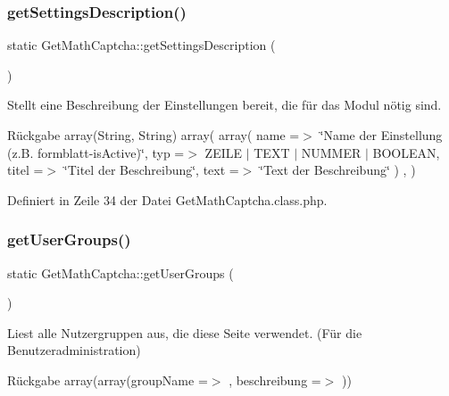 \subsubsection{\texorpdfstring{get\+Settings\+Description()}{getSettingsDescription()}\hspace{0.1cm}{\footnotesize\ttfamily [2/2]}}
{\footnotesize\ttfamily static Get\+Math\+Captcha\+::get\+Settings\+Description (\begin{DoxyParamCaption}{ }\end{DoxyParamCaption})\hspace{0.3cm}{\ttfamily [static]}}

Stellt eine Beschreibung der Einstellungen bereit, die für das Modul nötig sind. \begin{DoxyReturn}{Rückgabe}
array(\+String, String) array( array( \textquotesingle{}name\textquotesingle{} =$>$ \char`\"{}\+Name der Einstellung (z.\+B. formblatt-\/is\+Active)\char`\"{}, \textquotesingle{}typ\textquotesingle{} =$>$ Z\+E\+I\+LE $\vert$ T\+E\+XT $\vert$ N\+U\+M\+M\+ER $\vert$ B\+O\+O\+L\+E\+AN, \textquotesingle{}titel\textquotesingle{} =$>$ \char`\"{}\+Titel der Beschreibung\char`\"{}, \textquotesingle{}text\textquotesingle{} =$>$ \char`\"{}\+Text der Beschreibung\char`\"{} ) , ) 
\end{DoxyReturn}


Definiert in Zeile 34 der Datei Get\+Math\+Captcha.\+class.\+php.

\mbox{\label{class_get_math_captcha_ac6892757e363876674f9187917959bd7}} 
\subsubsection{\texorpdfstring{get\+User\+Groups()}{getUserGroups()}\hspace{0.1cm}{\footnotesize\ttfamily [1/2]}}
{\footnotesize\ttfamily static Get\+Math\+Captcha\+::get\+User\+Groups (\begin{DoxyParamCaption}{ }\end{DoxyParamCaption})\hspace{0.3cm}{\ttfamily [static]}}

Liest alle Nutzergruppen aus, die diese Seite verwendet. (Für die Benutzeradministration) \begin{DoxyReturn}{Rückgabe}
array(array(\textquotesingle{}group\+Name\textquotesingle{} =$>$ \textquotesingle{}\textquotesingle{}, \textquotesingle{}beschreibung\textquotesingle{} =$>$ \textquotesingle{}\textquotesingle{})) 
\end{DoxyReturn}


